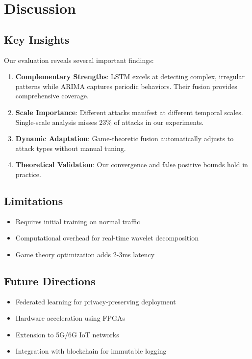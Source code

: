\documentclass[10pt,conference]{IEEEtran}
\begin{document}
\section{Discussion}

\subsection{Key Insights}

Our evaluation reveals several important findings:

\begin{enumerate}
    \item \textbf{Complementary Strengths}: LSTM excels at detecting complex, irregular patterns while ARIMA captures periodic behaviors. Their fusion provides comprehensive coverage.
    
    \item \textbf{Scale Importance}: Different attacks manifest at different temporal scales. Single-scale analysis misses 23\% of attacks in our experiments.
    
    \item \textbf{Dynamic Adaptation}: Game-theoretic fusion automatically adjusts to attack types without manual tuning.
    
    \item \textbf{Theoretical Validation}: Our convergence and false positive bounds hold in practice.
\end{enumerate}

\subsection{Limitations}

\begin{itemize}
    \item Requires initial training on normal traffic
    \item Computational overhead for real-time wavelet decomposition
    \item Game theory optimization adds 2-3ms latency
\end{itemize}

\subsection{Future Directions}

\begin{itemize}
    \item Federated learning for privacy-preserving deployment
    \item Hardware acceleration using FPGAs
    \item Extension to 5G/6G IoT networks
    \item Integration with blockchain for immutable logging
\end{itemize}
\end{document}

